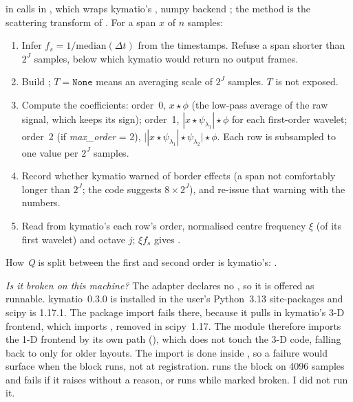  in  calls
 in ,
which wraps kymatio's , numpy backend \citep{andreux2020kymatio}; the method
is the scattering transform of \citet{anden2014deep}. For a span $x$ of $n$ samples:
\begin{enumerate}
\item Infer $f_s = 1/\mathrm{median}(\Delta t)$ from the timestamps. Refuse a span shorter than
  $2^J$ samples, below which kymatio would return no output frames.
\item Build ; $T = \texttt{None}$ means an
  averaging scale of $2^J$ samples. $T$ is not exposed.
\item Compute the coefficients:
  order~0, $x \star \phi$ (the low-pass average of the raw signal, which keeps its sign);
  order~1, $|x \star \psi_{\lambda_1}| \star \phi$ for each first-order wavelet;
  order~2 (if \emph{max\_order} = 2), $\bigl||x \star \psi_{\lambda_1}| \star \psi_{\lambda_2}\bigr| \star \phi$.
  Each row is subsampled to one value per $2^J$ samples.
\item Record whether kymatio warned of border effects (a span not comfortably longer than
  $2^J$; the code suggests $8\times2^J$), and re-issue that warning with the numbers.
\item Read from kymatio's  each row's order, normalised centre frequency
  $\xi$ (of its first wavelet) and octave $j$; $\xi f_s$ gives .
\end{enumerate}
How \emph{Q} is split between the first and second order is kymatio's:
.

\emph{Is it broken on this machine?} The adapter declares no , so it is offered
as runnable. kymatio~0.3.0 is installed in the user's Python~3.13 site-packages and scipy is
1.17.1. The package import  fails there, because it pulls in kymatio's 3-D
frontend, which imports , removed in scipy~1.17. The module therefore
imports the 1-D frontend by its own path
(), which does not touch the
3-D code, falling back to  only for older layouts. The import is done inside
, so a failure would surface when the block runs, not at registration.
 runs the block on 4096 samples and fails if it raises without
a  reason, or runs while marked broken. I did not run it.

